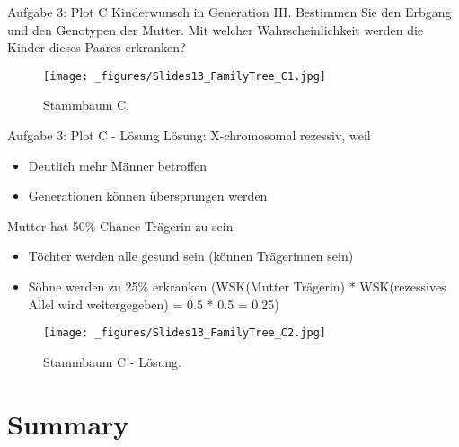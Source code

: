 \documentclass{beamer}
\begin{document}
\begin{frame}{Aufgabe 3: Plot C}
Kinderwunsch in Generation III. Bestimmen Sie den Erbgang und den Genotypen der Mutter. Mit welcher Wahrscheinlichkeit werden die Kinder dieses Paares erkranken?

\begin{figure}[h]
\begin{center}
\texttt{[image: \_figures/Slides13\_FamilyTree\_C1.jpg]}
\caption{Stammbaum C.}
\label{fig:tree_C1}
\end{center}
\end{figure}    
\end{frame}

\begin{frame}{Aufgabe 3: Plot C - Lösung}
Lösung: X-chromosomal rezessiv, weil

\begin{itemize}
    \item Deutlich mehr Männer betroffen
    \item Generationen können übersprungen werden  
\end{itemize}

Mutter hat 50\% Chance Trägerin zu sein

\begin{itemize}
    \item Töchter werden alle gesund sein (können Trägerinnen sein)
    \item Söhne werden zu 25\% erkranken (WSK(Mutter Trägerin) * WSK(rezessives Allel wird weitergegeben) = 0.5 * 0.5 = 0.25)
\end{itemize}

\begin{figure}[h]
\begin{center}
\texttt{[image: \_figures/Slides13\_FamilyTree\_C2.jpg]}
\caption{Stammbaum C - Lösung.}
\label{fig:tree_C2}
\end{center}
\end{figure}    
\end{frame}

\section{Summary}
\end{document}
